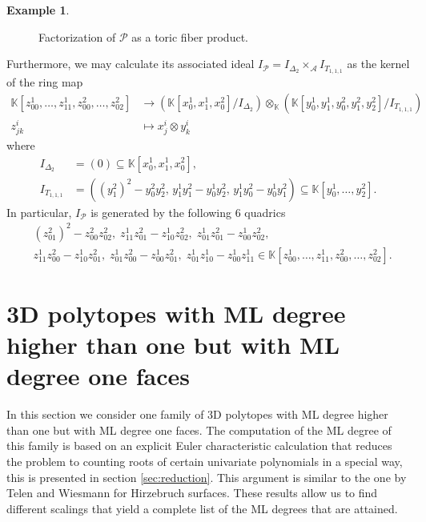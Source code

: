\documentclass[12pt,reqno]{amsart}   	%
\theoremstyle{plain}
\theoremstyle{definition}
\newtheorem{example}[theorem]{Example}
\theoremstyle{remark}
\begin{document}
\begin{example}
\begin{figure}[H]
\begin{tikzpicture}
\end{tikzpicture}
    \caption{Factorization of $\mathcal{P}$ as a toric fiber product.}
\end{figure}
Furthermore, we may calculate its associated ideal  $I_{\mathcal{P}} = I_{\Delta_2} \times_{\mathcal{A}} I_{T_{1,1,1}}$ as the kernel of the ring map
\begin{align*}
            \mathbb{K}[z^1_{00},\dots,z^1_{11},z^2_{00},\dots, z^2_{02}] &\longrightarrow \left( \mathbb{K}[x^1_0,x^1_1,x^2_0]/I_{\Delta_2} \right) \otimes_{\mathbb{K}} \left( \mathbb{K}[y^1_0,y^1_1,y^2_0,y^2_1,y^2_2]/I_{T_{1,1,1}} \right) \\
        z^i_{jk} &\longmapsto x^i_j \otimes y^i_k
\end{align*}
where 
\begin{align*}
I_{\Delta_2} &= (0) \subseteq \mathbb{K}[x_0^1,x_1^1,x_0^2], \\
I_{T_{1,1,1}} &= \left( (y^2_1)^2 - y^2_0 y^2_2,\, y^1_1 y^2_1 - y^1_0 y^2_2,\, y^1_1 y^2_0 - y^1_0 y^2_1 \right) \subseteq \mathbb{K}[y_0^1,\dots, y_2^2].
\end{align*}
In particular, $I_{\mathcal{P}}$ is generated by the following 6 quadrics
\begin{align*}
    &
    (z^2_{01})^2 - z^2_{00}z^2_{02},\; 
    z^1_{11}z^2_{01} - z^1_{10}z^2_{02},\; 
    z^1_{01}z^2_{01} - z^1_{00}z^2_{02},\; \\
    &z^1_{11}z^2_{00} - z^1_{10}z^2_{01},\; 
    z^1_{01}z^2_{00} - z^1_{00}z^2_{01},\; 
    z^1_{01}z^1_{10} - z^1_{00}z^1_{11} %
    \in \mathbb{K}[z^1_{00},\dots,z^1_{11},z^2_{00},\dots,z^2_{02}].
\end{align*}
\end{example}

\section{3D polytopes with ML degree higher than one but with ML degree one faces}
In this section we consider one family of 3D polytopes with ML degree higher than one but with ML degree one faces. The computation of the ML degree of this family is based on an explicit Euler characteristic calculation that reduces the problem to counting roots of certain univariate polynomials in a special way, this is presented in section \ref{sec:reduction}. This argument is similar to the
one by Telen and Wiesmann \cite{telen2024} for Hirzebruch surfaces. These results allow us to find different scalings that yield
a complete list of the ML degrees that are attained.
\end{document}
